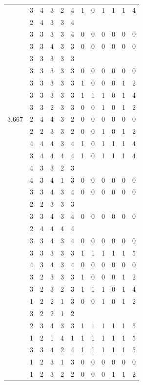 \documentclass[]{msu-thesis}
\theoremstyle{definition}
\theoremstyle{definition}
\theoremstyle{definition}
\theoremstyle{remark}
\begin{document}
\begin{table}
{\begin{tabular}[t]{rrrrrrrrrrrr}
 & 3 & 4 & 3 & 2 & 4 & 1 & 0 & 1 & 1 & 1 & 4\\
 & 2 & 4 & 3 & 3 & 4 &  &  &  &  &  & \\
 & 3 & 3 & 3 & 3 & 4 & 0 & 0 & 0 & 0 & 0 & 0\\
 & 3 & 3 & 4 & 3 & 3 & 0 & 0 & 0 & 0 & 0 & 0\\
 & 3 & 3 & 3 & 3 & 3 &  &  &  &  &  & \\
 & 3 & 3 & 3 & 3 & 3 & 0 & 0 & 0 & 0 & 0 & 0\\
 & 3 & 3 & 3 & 3 & 3 & 1 & 0 & 0 & 0 & 1 & 2\\
 & 3 & 3 & 3 & 3 & 3 & 1 & 1 & 1 & 0 & 1 & 4\\
 & 3 & 3 & 2 & 3 & 3 & 0 & 0 & 1 & 0 & 1 & 2\\
3.667 & 2 & 4 & 4 & 3 & 2 & 0 & 0 & 0 & 0 & 0 & 0\\
 & 2 & 2 & 3 & 3 & 2 & 0 & 0 & 1 & 0 & 1 & 2\\
 & 4 & 4 & 4 & 3 & 4 & 1 & 0 & 1 & 1 & 1 & 4\\
 & 3 & 4 & 4 & 4 & 4 & 1 & 0 & 1 & 1 & 1 & 4\\
 & 4 & 3 & 3 & 2 & 3 &  &  &  &  &  & \\
 & 4 & 3 & 4 & 1 & 3 & 0 & 0 & 0 & 0 & 0 & 0\\
 & 3 & 3 & 4 & 3 & 4 & 0 & 0 & 0 & 0 & 0 & 0\\
 & 2 & 2 & 3 & 3 & 3 &  &  &  &  &  & \\
 & 3 & 3 & 4 & 3 & 4 & 0 & 0 & 0 & 0 & 0 & 0\\
 & 2 & 4 & 4 & 4 & 4 &  &  &  &  &  & \\
 & 3 & 3 & 4 & 3 & 4 & 0 & 0 & 0 & 0 & 0 & 0\\
 & 3 & 3 & 3 & 3 & 3 & 1 & 1 & 1 & 1 & 1 & 5\\
 & 4 & 3 & 4 & 3 & 4 & 0 & 0 & 0 & 0 & 0 & 0\\
 & 3 & 2 & 3 & 3 & 3 & 1 & 0 & 0 & 0 & 1 & 2\\
 & 3 & 2 & 3 & 2 & 3 & 1 & 1 & 1 & 0 & 1 & 4\\
 & 1 & 2 & 2 & 1 & 3 & 0 & 0 & 1 & 0 & 1 & 2\\
 & 3 & 2 & 2 & 1 & 2 &  &  &  &  &  & \\
 & 2 & 3 & 4 & 3 & 3 & 1 & 1 & 1 & 1 & 1 & 5\\
 & 1 & 2 & 1 & 4 & 1 & 1 & 1 & 1 & 1 & 1 & 5\\
 & 3 & 3 & 4 & 2 & 4 & 1 & 1 & 1 & 1 & 1 & 5\\
 & 1 & 2 & 3 & 1 & 3 & 0 & 0 & 0 & 0 & 0 & 0\\
 & 1 & 2 & 3 & 2 & 2 & 0 & 0 & 0 & 1 & 1 & 2\\

\end{tabular}}
\end{table}
\end{document}
